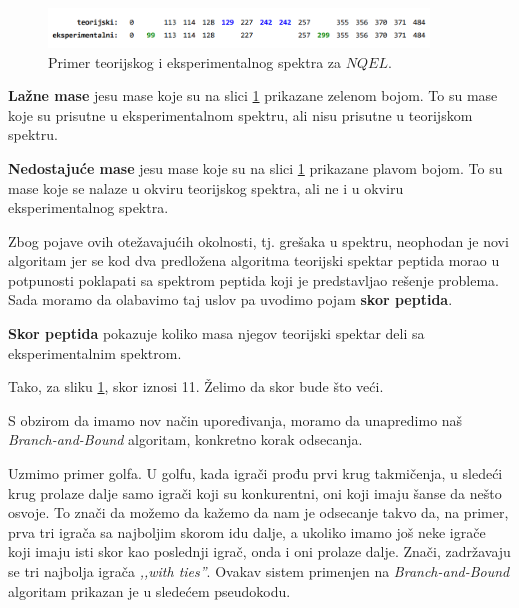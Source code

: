 \begin{figure}[h!]
	\centering
	\includegraphics[width=0.9\textwidth]{poglavlja/4/slike/ekspSpektar.png}
	\caption{Primer teorijskog i eksperimentalnog spektra za $NQEL$.}
	\label{slika:ekspSpektar}
\end{figure} 

\textbf{Lažne mase} jesu mase koje su na slici \ref{slika:ekspSpektar} prikazane zelenom bojom. To su mase koje su prisutne u eksperimentalnom spektru, ali nisu prisutne u teorijskom spektru.

\textbf{Nedostajuće mase} jesu mase koje su na slici \ref{slika:ekspSpektar} prikazane plavom bojom. To su mase koje se nalaze u okviru teorijskog spektra, ali ne i u okviru eksperimentalnog spektra.

Zbog pojave ovih otežavajućih okolnosti, tj. grešaka u spektru, neophodan je novi algoritam jer se kod dva predložena algoritma teorijski spektar peptida morao u potpunosti poklapati sa spektrom peptida koji je predstavljao rešenje problema. Sada moramo da olabavimo taj uslov pa uvodimo pojam \textbf{skor peptida}.

\begin{definicija}
\textbf{Skor peptida} pokazuje koliko masa njegov teorijski spektar deli sa eksperimentalnim spektrom.
\end{definicija}

\noindent Tako, za sliku \ref{slika:ekspSpektar}, skor iznosi 11. Želimo da skor bude što veći.

S obzirom da imamo nov način upoređivanja, moramo da unapredimo naš \textit{Branch-and-Bound} algoritam, konkretno korak odsecanja. 

Uzmimo primer golfa. U golfu, kada igrači prođu prvi krug takmičenja, u sledeći krug prolaze dalje samo igrači koji su konkurentni, oni koji imaju šanse da nešto osvoje. To znači da možemo da kažemo da nam je odsecanje takvo da, na primer, prva tri igrača sa najboljim skorom idu dalje, a ukoliko imamo još neke igrače koji imaju isti skor kao poslednji igrač, onda i oni prolaze dalje. Znači, zadržavaju se tri najbolja igrača \textit{,,with ties''}. Ovakav sistem primenjen na \textit{Branch-and-Bound} algoritam prikazan je u sledećem pseudokodu.

